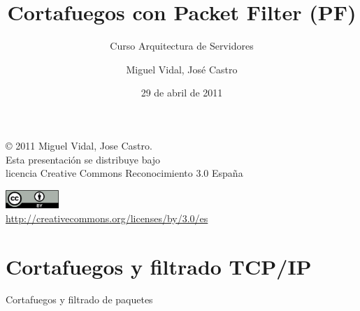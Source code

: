 \documentclass{beamer}
\begin{document}
\title{Cortafuegos con Packet Filter (PF)}
\subtitle{Curso Arquitectura de Servidores}
\author{Miguel Vidal, José Castro}
\date{29 de abril de 2011}


\begin{frame}
  \vspace{2cm}
  \begin{flushright}
    {\footnotesize \copyright{} 2011 Miguel Vidal, Jose Castro.} \\
    \medskip
    {\scriptsize Esta presentación se distribuye bajo \\ licencia Creative Commons Reconocimiento 3.0 España}
  \end{flushright}
  \begin{center}
    \href{http://creativecommons.org/licenses/by/3.0/es}{\includegraphics[width=2cm]{format/cc-by.png}} \\
    {\tiny \url{http://creativecommons.org/licenses/by/3.0/es}}
  \end{center}
\end{frame}%


\normalsize

\section{Cortafuegos y filtrado TCP/IP}

\begin{frame}

\begin{center}
\huge{Cortafuegos y filtrado de paquetes}
\end{center}

\end{frame}
\end{document}
